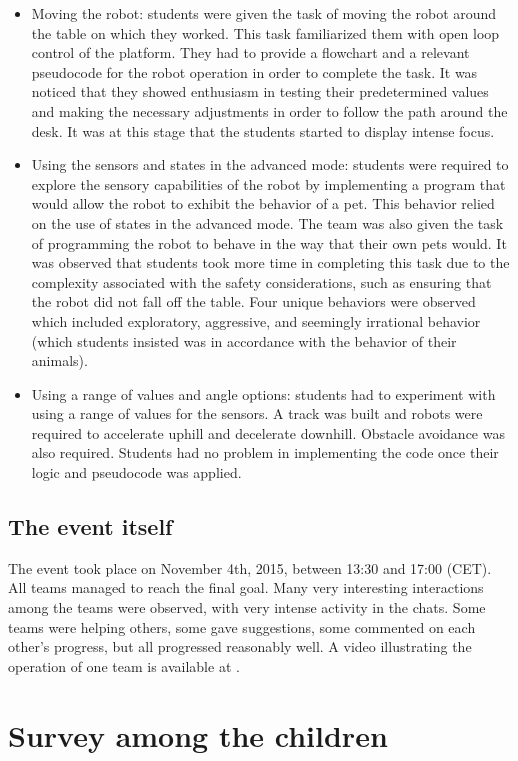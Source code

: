 \documentclass{intech-journal}
\begin{document}
\begin{itemize}
\item Moving the robot: students were given the task of moving the robot around the table on which they worked. This task familiarized them with open loop control of the platform. 
They had to provide a flowchart and a relevant pseudocode for the robot operation in order to complete the task. 
It was noticed that they showed enthusiasm in testing their predetermined values and making the necessary adjustments in order to follow the path around the desk. It was at this stage that the students started to display intense focus.
\item Using the sensors and states in the advanced mode: students were required to explore the sensory capabilities of the robot by implementing a program that would allow the robot to exhibit the behavior of a pet. 
This behavior relied on the use of states in the advanced mode. 
The team was also given the task of programming the robot to behave in the way that their own pets would.  
It was observed that students took more time in completing this task due to the complexity associated with the safety considerations, such as ensuring that the robot did not fall off the table. 
Four unique behaviors were observed which included exploratory, aggressive, and seemingly irrational behavior (which students insisted was in accordance with the behavior of their animals).
\item Using a range of values and angle options: students had to experiment with using a range of values for the sensors.
A track was built and robots were required to accelerate uphill and decelerate downhill. 
Obstacle avoidance was also required.
Students had no problem in implementing the code once their logic and pseudocode was applied.
\end{itemize}

\subsection{The event itself}

The event took place on November 4th, 2015, between 13:30 and 17:00 (CET).
All teams managed to reach the final goal.
Many very interesting interactions among the teams were observed, with very intense activity in the chats.
Some teams were helping others, some gave suggestions, some commented on each other's progress, but all progressed reasonably well.
A video illustrating the operation of one team is available at \cite{SwissinfoR2T2}.

\section{Survey among the children}
\end{document}
